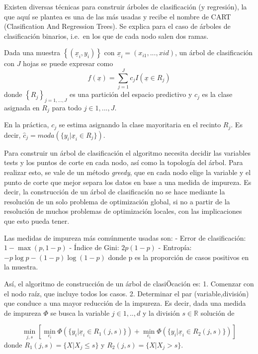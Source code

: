\documentclass[12pt,a4paper,]{book}
\numberwithin{dummy}{section}
\theoremstyle{ocrenumbox}
\theoremstyle{blacknumex}
\theoremstyle{blacknumbox}
\theoremstyle{ocrenum}
\theoremstyle{ocrenum}
\begin{document}
Existen diversas técnicas para construir árboles de clasificación (y
regresión), la que aquí se plantea es una de las más usadas y recibe el
nombre de CART (Clasification And Regression Trees). Se explica para el
caso de árboles de clasificación binarios, i.e.~en los que de cada nodo
salen dos ramas.

Dada una muestra \(\left\{ (\underline x_i,y_i) \right\}\) con
\(\underline x_i = (x_{i1},...,x{id})\), un árbol de clasificación con
\(J\) hojas se puede expresar como
\[f(\underline x) = \sum_{j=1}^J c_j I(\underline x \in R_j)\] donde
\(\left\{ R_j\right\}_{j=1,...,J}\) es una partición del espacio
predictivo y \(c_j\) es la clase asignada en \(R_j\) para todo
\(j \in {1,...,J}\).

En la práctica, \(c_j\) se estima asignando la clase mayoritaria en el
recinto \(R_j\). Es decir,
\(\hat c_j = moda(\{y_i | \underline x_i \in R_j\})\).

Para construir un árbol de clasificación el algoritmo necesita decidir
las variables tests y los puntos de corte en cada nodo, así como la
topología del árbol. Para realizar esto, se vale de un método
\emph{greedy}, que en cada nodo elige la variable y el punto de corte
que mejor separa los datos en base a una medida de impureza. Es decir,
la construcción de un árbol de clasificación no se hace mediante la
resolución de un solo problema de optimización global, si no a partir de
la resolución de muchos problemas de optimización locales, con las
implicaciones que esto pueda tener.

Las medidas de impureza más comúnmente usadas son: - Error de
clasificación: \(1 - \max(p,1-p)\) - Índice de Gini: \(2p(1-p)\) -
Entropía: \(-p \log p - (1 − p) \log (1 - p)\) donde p es la proporción
de casos positivos en la muestra.

Así, el algoritmo de construcción de un árbol de clasiÖcación es: 1.
Comenzar con el nodo raíz, que incluye todos los casos. 2. Determinar el
par (variable,división) que conduce a una mayor reducción de la
impureza. Es decir, dada una medida de impureza \(\Phi\) se busca la
variable \(j \in {1,..,d}\) y la división \(s \in \mathbb{R}\) solución
de

\[\min_{j,s}\left[ 
\min_{c_i} \Phi \left(\{y_i |\underline x_i \in R_1(j,s)\} \right)  + 
\min_{c_i} \Phi \left(\{y_i |\underline x_i \in R_2(j,s)\} \right)\right]\]
donde \(R_1(j,s) = \{X | X_j \le s \}\) y
\(R_2(j,s) = \{X | X_j \gt s \}\).
\end{document}

